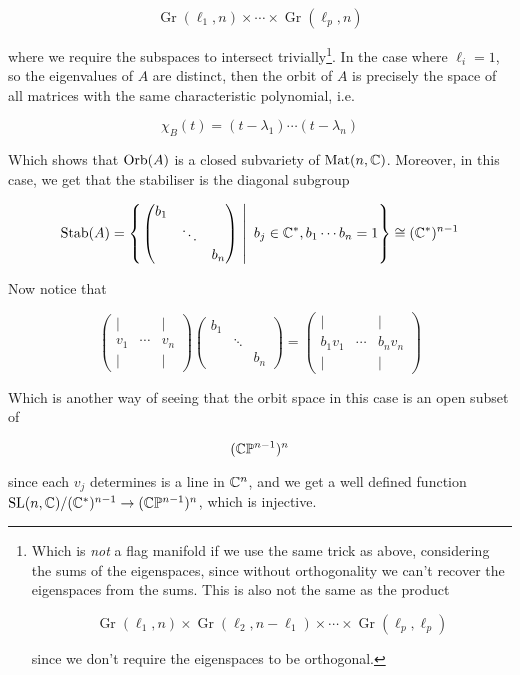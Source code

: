 \documentclass{article}
\DeclareMathOperator{\Gr}{Gr}
\begin{document}
\[\Gr(\ell_1, n) \times \cdots \times \Gr(\ell_p, n)\]

where we require the subspaces to intersect trivially\footnote{Which is \emph{not} a flag manifold if we use the same trick as above, considering the sums of the eigenspaces, since without orthogonality we can't recover the eigenspaces from the sums. This is also not the same as the product

\[\Gr(\ell_1, n) \times \Gr(\ell_2, n - \ell_1) \times \cdots \times \Gr(\ell_p, \ell_p)\]

since we don't require the eigenspaces to be orthogonal.}. In the case where \(\ell_i = 1\), so the eigenvalues of \(A\) are distinct, then the orbit of \(A\) is precisely the space of all matrices with the same characteristic polynomial, i.e.

\[\chi_B(t) = (t - \lambda_1)\cdots(t - \lambda_n)\]

Which shows that \(\operatorname{Orb}(A)\) is a closed subvariety of \(\operatorname{Mat}(n, \mathbb{C})\). Moreover, in this case, we get that the stabiliser is the diagonal subgroup

\[\operatorname{Stab}(A) = \left\{\left.\begin{pmatrix}
    b_1 & \\
    & \ddots \\
    & & b_n
\end{pmatrix}\ \right\vert\ b_j \in \mathbb{C}^*, b_1\cdots b_n = 1 \right\} \cong (\mathbb{C}^*)^{n-1}\]

Now notice that

\[\begin{pmatrix}
    \vert & & \vert \\
    v_1 & \cdots & v_n \\
    \vert & & \vert
\end{pmatrix}\begin{pmatrix}
    b_1 & \\
    & \ddots \\
    & & b_n
\end{pmatrix} = \begin{pmatrix}
    \vert & & \vert \\
    b_1v_1 & \cdots & b_nv_n \\
    \vert & & \vert
\end{pmatrix}\]

Which is another way of seeing that the orbit space in this case is an open subset of

\[(\mathbb{C} \mathbb{P}^{n-1})^n\]

since each \(v_j\) determines is a line in \(\mathbb{C}^n\), and we get a well defined function \(\operatorname{SL}(n, \mathbb{C})/(\mathbb{C}^*)^{n-1} \to (\mathbb{C} \mathbb{P}^{n-1})^n\), which is injective.
\end{document}
